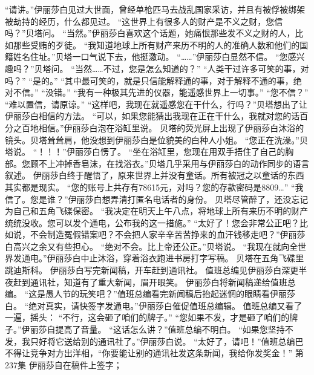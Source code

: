 \documentclass[a4paper,12pt,UTF8,twoside]{ctexbook}
\begin{document}
        “请讲。”伊丽莎白见过大世面，曾经单枪匹马去战乱国家采访，并且有被俘被绑架被劫持的经历，什么都见过。  
        “这世界上有很多人的财产是不义之财，您信吗？”贝塔问。  
        “当然。”伊丽莎白喜欢这个话题，她痛恨那些发不义之财的人，比如那些受贿的歹徒。  
        “我知道地球上所有财产来历不明的人的准确人数和他们的国籍姓名住址。”贝塔一口气说下去，他挺激动。  
        “……”伊丽莎白显然不信。  
        “您感兴趣吗？”贝塔问。  
        “当然……不过，您是怎么知道的？”  
        “人类干过许多可笑的事，对吗？”  
        “是的。”  
        “其中最可笑的，就是只信能解释通的事，对于解释不通的事，绝对不信。”  
        “没错。”  
        “我有一种极其先进的仪器，能遥感世界上一切事。”        
        “您不信？”  
        “难以置信，请原谅。”  
        “这样吧，我现在就遥感您在干什么，行吗？”贝塔想出了让伊丽莎白相信的方法。  
        “可以，如果您能猜出我现在正在干什么，我就对您的话百分之百地相信。”伊丽莎白泡在浴缸里说。  
        贝塔的荧光屏上出现了伊丽莎白沐浴的镜头。贝塔耸耸肩，他没想到伊丽莎白是位貌美的白种人小姐。  
        “您正在洗澡。”贝塔说。  
        “！！！”伊丽莎白愣了。  
        “坐在浴缸里，您现在用双手捂住了自己的胸部。您顾不上冲掉香皂沫，在找浴衣。”贝塔几乎采用与伊丽莎白的动作同步的语言叙述。  
        伊丽莎白终于醒悟了，原来世界上并没有童话。所有被冠之以童话的东西其实都是现实。  
        “您的账号上共存有78615元，对吗？您的存款密码是8809…”  
        “我信了。您是谁？”伊丽莎白想弄清打匿名电话者的身份。  
        贝塔尽管醉了，还没忘记为自己和五角飞碟保密。  
        “我决定在明天上午八点，将地球上所有来历不明的财产统统没收。您可以发个通电，公布我的这一措施。”  
        “太好了！您会非常公正吧？比如说，不会制造冤假错案吧？不会把人家辛辛苦苦挣来的血汗钱移走吧？”伊丽莎白高兴之余又有些担心。  
        “绝对不会。比上帝还公正。”贝塔说。  
        “我现在就向全世界发通电。”伊丽莎白中止沐浴，穿着浴衣跑进书房打字写稿。  
        贝塔在五角飞碟里跳迪斯科。  
        伊丽莎白写完新闻稿，开车赶到通讯社。  
        值班总编见伊丽莎白深更半夜赶到通讯社，知道有了重大新闻，眉开眼笑。  
        伊丽莎白将新闻稿递给值班总编。  
        “这是愚人节的玩笑吧？”值班总编看完新闻稿后抬起迷惘的眼睛看伊丽莎白。  
        “绝对真实，请快签字发通电。”伊丽莎白催促值班总编辑。  
        值班总编又看了一遍，摇头：  
        “不行，这会砸了咱们的牌子。”  
        “您如果不发，才是砸了咱们的牌子。”伊丽莎自提高了音量。  
        “这话怎么讲？”值班总编不明白。        
        “如果您坚持不发，我只好将它送给别的通讯社了。”伊丽莎白说。  
        “太好了，请吧！”值班总编巴不得让竞争对方出洋相，“你要能让别的通讯社发这条新闻，我给你发奖金！”          第237集  
        伊丽莎自在稿件上签字；  
\end{document}
